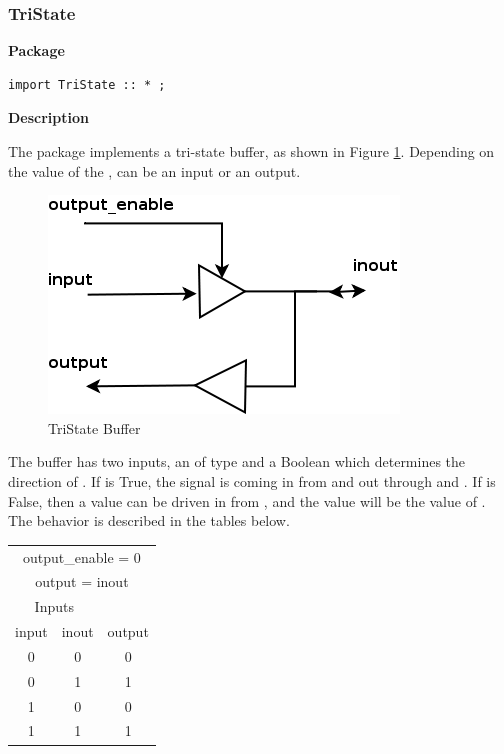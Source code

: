 \subsubsection{TriState}

{\bf Package}


\begin{verbatim}
import TriState :: * ;
\end{verbatim}

{\bf Description}

The  package  implements a
tri-state buffer, as shown in Figure \ref{tristate}.  Depending on the
value of the ,   can be an input or an output.

\begin{figure}[ht]
\begin{center}
\includegraphics[width = 2 in]{LibFig/tristate}
\caption{TriState Buffer}
\label{tristate}
\end{center}
\end{figure}


The buffer has two
inputs,  an  of type  and a Boolean
 which  determines the direction
of .  If 
 is True, the signal is 
coming in from   and out through   and 
 .  
 If   is False, then a value can be driven in
 from  , and the  value will be the value of
  .  The behavior is described  in the tables below.  

\begin{center}
\begin{tabular}{|c|c||c|}
\hline
\multicolumn{3}{|c|}{output\_enable = 0}\\
\multicolumn{3}{|c|}{output = inout}\\
\hline
\multicolumn{2}{|c||}{Inputs}&\\
\cline{1-2}
input&inout&output\\
\hline
0&0&0\\
0&1&1\\
1&0&0\\
1&1&1\\
\hline
\end{tabular}
\end{center}

